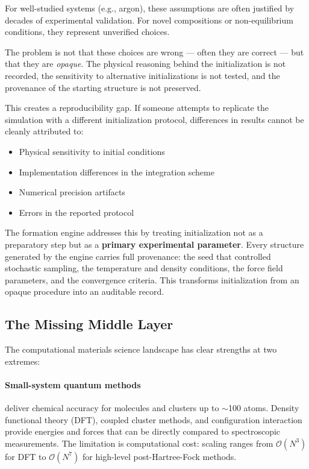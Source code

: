 \documentclass[11pt]{article}
\begin{document}
For well-studied systems (e.g., argon), these assumptions are often justified by decades of experimental validation. For novel compositions or non-equilibrium conditions, they represent unverified choices.

The problem is not that these choices are wrong — often they are correct — but that they are \textit{opaque}. The physical reasoning behind the initialization is not recorded, the sensitivity to alternative initializations is not tested, and the provenance of the starting structure is not preserved.

This creates a reproducibility gap. If someone attempts to replicate the simulation with a different initialization protocol, differences in results cannot be cleanly attributed to:

\begin{itemize}
\item Physical sensitivity to initial conditions
\item Implementation differences in the integration scheme
\item Numerical precision artifacts
\item Errors in the reported protocol
\end{itemize}

The formation engine addresses this by treating initialization not as a preparatory step but as a \textbf{primary experimental parameter}. Every structure generated by the engine carries full provenance: the seed that controlled stochastic sampling, the temperature and density conditions, the force field parameters, and the convergence criteria. This transforms initialization from an opaque procedure into an auditable record.

\subsection{The Missing Middle Layer}

The computational materials science landscape has clear strengths at two extremes:

\paragraph{Small-system quantum methods} deliver chemical accuracy for molecules and clusters up to $\sim$100 atoms. Density functional theory (DFT), coupled cluster methods, and configuration interaction provide energies and forces that can be directly compared to spectroscopic measurements. The limitation is computational cost: scaling ranges from $\mathcal{O}(N^3)$ for DFT to $\mathcal{O}(N^7)$ for high-level post-Hartree-Fock methods.
\end{document}
